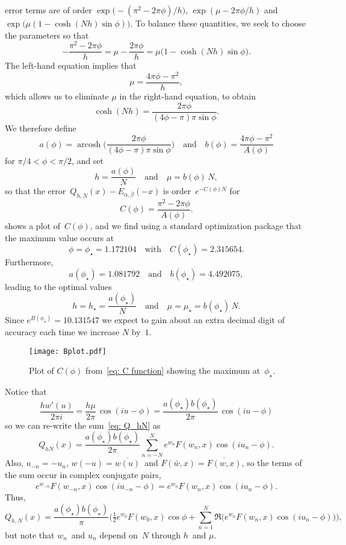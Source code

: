\documentclass[12pt,a4paper]{article}
\newcommand{\arcosh}{\operatorname{arcosh}}
\begin{document}
error terms are of order $\exp\bigl(-(\pi^2-2\pi\phi)/h\bigr)$,
$\exp(\mu-2\pi\phi/h)$ and $\exp\bigl(\mu(1-\cosh(Nh)\sin\phi)\bigr)$.
To balance these quantities, we seek to choose the parameters so that
\cite[(4.2)]{WeidemanTrefethen2007}
\[
-\frac{\pi^2-2\pi\phi}{h}=\mu-\frac{2\pi\phi}{h}
    =\mu\bigl(1-\cosh(Nh)\sin\phi\bigr).
\]
The left-hand equation implies that
\[
\mu=\frac{4\pi\phi-\pi^2}{h},
\]
which allows us to eliminate $\mu$ in the right-hand equation, to obtain
\[
\cosh(Nh)=\frac{2\pi\phi}{(4\phi-\pi)\pi\sin\phi}.
\]
We therefore define
\[
a(\phi)=\arcosh\biggl(\frac{2\pi\phi}{(4\phi-\pi)\pi\sin\phi}\biggr)
\quad\text{and}\quad b(\phi)=\frac{4\pi\phi-\pi^2}{A(\phi)}
\]
for $\pi/4<\phi<\pi/2$, and set
\[
h=\frac{a(\phi)}{N}\quad\text{and}\quad \mu=b(\phi)\,N,
\]
so that the error~$Q_{h,N}(x)-E_{\alpha,\beta}(-x)$ is order~$e^{-C(\phi)N}$ 
for
\begin{equation}\label{eq: C function}
C(\phi)=\frac{\pi^2-2\pi\phi}{A(\phi)}.
\end{equation}
 shows a plot of~$C(\phi)$, and we find using a standard 
optimization package that the maximum value occurs at
\[
\phi=\phi_\star=1.172104\quad\text{with}\quad C(\phi_\star)=2.315654.
\]
Furthermore,
\[
a(\phi_\star)=1.081792\quad\text{and}\quad
b(\phi_\star)=4.492075,
\]
leading to the optimal values 
\[
h=h_\star=\frac{a(\phi_\star)}{N}\quad\text{and}\quad
\mu=\mu_\star=b(\phi_\star)\,N.
\]
Since $e^{B(\phi_\star)}=10.131547$ we expect to gain about an extra decimal
digit of accuracy each time we increase $N$ by~$1$.

\begin{figure}
\caption{Plot of $C(\phi)$ from~\eqref{eq: C function} showing the 
maximum at~$\phi_\star$.}\label{fig: C plot}
\begin{center}
\texttt{[image: Bplot.pdf]}
\end{center}
\end{figure}

Notice that
\[
\frac{hw'(u)}{2\pi i}=\frac{h\mu}{2\pi}\,\cos(iu-\phi)
    =\frac{a(\phi_\star)b(\phi_\star)}{2\pi}\,\cos(iu-\phi)
\]
so we can re-write the sum~\eqref{eq: Q_hN} as
\[
Q_{hN}(x)=\frac{a(\phi_\star)b(\phi_\star)}{2\pi}\sum_{n=-N}^N
    e^{w_n}F(w_n,x)\cos(iu_n-\phi).
\]
Also, $u_{-n}=-u_n$, $w(-u)=\overline{w(u)}$~and 
$F(\bar w,x)=\overline{F(w,x)}$, so the terms of the sum occur in complex 
conjugate pairs,
\[
e^{w_{-n}}F(w_{-n},x)\cos(iu_{-n}-\phi)
    =\overline{e^{w_n}F(w_n,x)\cos(iu_n-\phi)}.
\]
Thus,
\[
Q_{h,N}(x)=\frac{a(\phi_\star)b(\phi_\star)}{\pi}\biggl(
    \tfrac12e^{w_0}F(w_0,x)\cos\phi
    +\sum_{n=1}^N\Re\bigl(e^{w_n}F(w_n,x)\cos(iu_n-\phi)\bigr)\biggr),
\]
but note that $w_n$~and $u_n$ depend on~$N$ through $h$~and $\mu$.
\end{document}
